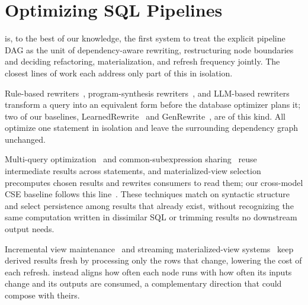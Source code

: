 
\section{Optimizing SQL Pipelines}
\label{dag:sec:related}


\dagsmith is, to the best of our knowledge, the first system to treat the explicit pipeline DAG as the unit of dependency-aware rewriting, restructuring node boundaries and deciding refactoring, materialization, and refresh frequency jointly. The closest lines of work each address only part of this in isolation.

Rule-based rewriters~\cite{wetune,LR}, program-synthesis rewriters~\cite{dong2023slabcity}, and LLM-based rewriters~\cite{genrewrite,sun2024r,li2024llm} transform a query into an equivalent form before the database optimizer plans it; two of our baselines, LearnedRewrite~\cite{LR} and GenRewrite~\cite{genrewrite}, are of this kind. All optimize one statement in isolation and leave the surrounding dependency graph unchanged.

Multi-query optimization~\cite{sellis1988multiple,roy2000efficient} and common-subexpression sharing~\cite{scopeCSE,similarSubexpr} reuse intermediate results across statements, and materialized-view selection~\cite{agrawal2000automated,harinarayan1996implementing} precomputes chosen results and rewrites consumers to read them; our cross-model CSE baseline follows this line~\cite{scopeCSE}. These techniques match on syntactic structure and select persistence among results that already exist, without recognizing the same computation written in dissimilar SQL or trimming results no downstream output needs.


Incremental view maintenance~\cite{ivm} and streaming materialized-view systems~\cite{materialize,risingwave} keep derived results fresh by processing only the rows that change, lowering the cost of each refresh. \dagsmith instead aligns how often each node runs with how often its inputs change and its outputs are consumed, a complementary direction that could compose with theirs.

